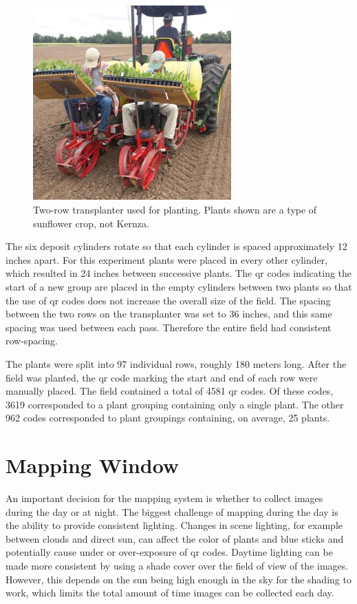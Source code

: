 \begin{figure}
	\centering
    \includegraphics[width=3in]{figures/transplanter.jpg}
    \caption[Transplanter]{Two-row transplanter used for planting. Plants shown are a type of sunflower crop, not Kernza.}
    \label{figure:transplanter}
\end{figure}  

The six deposit cylinders rotate so that each cylinder is spaced approximately 12 inches apart. For this experiment plants were placed in every other cylinder, which resulted in 24 inches between successive plants.  The \ac{qr} codes indicating the start of a new group are placed in the empty cylinders between two plants so that the use of \ac{qr} codes does not increase the overall size of the field. The spacing between the two rows on the transplanter was set to 36 inches, and this same spacing was used between each pass.  Therefore the entire field had consistent row-spacing. 

The plants were split into 97 individual rows, roughly 180 meters long.  After the field was planted, the \ac{qr} code marking the start and end of each row were manually placed.  The field contained a total of 4581 \ac{qr} codes.  Of these codes, 3619 corresponded to a plant grouping containing only a single plant.  The other 962 codes corresponded to plant groupings containing, on average, 25 plants.  

\section{Mapping Window}

An important decision for the mapping system is whether to collect images during the day or at night.  The biggest challenge of mapping during the day is the ability to provide consistent lighting.  Changes in scene lighting, for example between clouds and direct sun, can affect the color of plants and blue sticks and potentially cause under or over-exposure of \ac{qr} codes.  Daytime lighting can be made more consistent by using a shade cover over the field of view of the images.  However, this depends on the sun being high enough in the sky for the shading to work, which limits the total amount of time images can be collected each day.  

